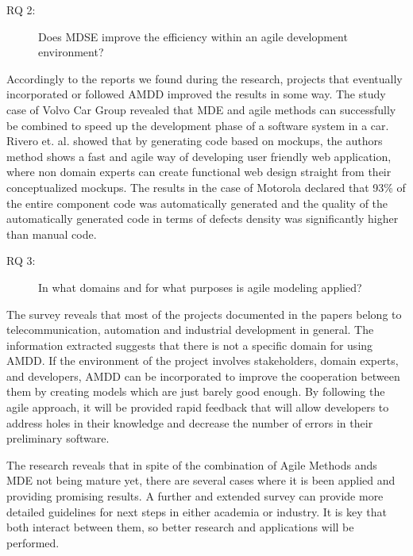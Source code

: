 \documentclass[10pt, a4paper, twocolumn]{article}
\begin{document}
\begin{description}
	\item[RQ 2:] Does MDSE improve the efficiency within an agile development environment?
\end{description}

Accordingly to the reports we found during the research, projects that eventually incorporated or followed AMDD improved the results in some way.
The study case of Volvo Car Group revealed that MDE and agile methods can successfully be combined to speed up the development phase of a software system in a car\cite{Eliasson2014}.
Rivero et. al. \cite{RIVERO2014670} showed that by generating code based on mockups, the authors method shows a fast and agile way of developing user friendly web application, where non domain experts can create functional web design straight from their conceptualized mockups.
The results in the case of Motorola \cite{zhang2011agile} declared that 93\% of the entire component code was automatically generated and the quality of the automatically generated code in terms of defects density was significantly higher than manual code.

\begin{description}
	\item[RQ 3:] In what domains and for what purposes is agile modeling applied?
\end{description}
The survey reveals that most of the projects documented in the papers belong to telecommunication, automation and industrial development in general.
The information extracted suggests that there is not a specific domain for using AMDD.
If the environment of the project involves stakeholders, domain experts, and developers, AMDD can be incorporated to improve the cooperation between them by creating models which are just barely good enough.
By following the agile approach, it will be provided rapid feedback that will allow developers to address holes in their knowledge and decrease the number of errors in their preliminary software.

The research reveals that in spite of the combination of Agile Methods ands MDE not being mature yet, there are several cases where it is been applied and providing promising results. A further and extended survey can provide more detailed guidelines for next steps in either academia or industry. It is key that both interact between them, so better research and applications will be performed.





\end{document}
